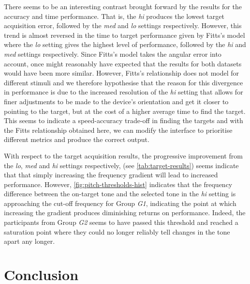 \documentclass[]{interact}
\begin{document}
There seems to be an interesting contrast brought forward by the results for the accuracy and time performance.
That is, the \textit{hi} produces the lowest target acquisition error, followed by the \textit{med} and \textit{lo} settings respectively. 
However, this trend is almost reversed in the time to target performance given by Fitts's model where the \textit{lo} setting gives the highest level of performance, followed by the \textit{hi} and \textit{med} settings respectively. 
Since Fitts's model takes the angular error into account, once might reasonably have expected that the results for both datasets would have been more similar. 
However, Fitts's relationship does not model for different stimuli and we therefore hypothesise that the reason for this divergence in performance is due to the increased resolution of the \textit{hi} setting that allows for finer adjustments to be made to the device's orientation and get it closer to pointing to the target, but at the cost of a higher average time to find the target. 
This seems to indicate a speed-accuracy trade-off in finding the targets and with the Fitts relationship obtained here, we can modify the interface to prioritise different metrics and produce the correct output.

With respect to the target acquisition results, the progressive improvement from the \textit{lo}, \textit{med} and \textit{hi} settings respectively, (see \cref{tab:target-results}) seems indicate that that simply increasing the frequency gradient will lead to increased performance.
However, \cref{fig:pitch-thresholds-hist} indicates that the frequency difference between the on-target tone and the selected tone in the \textit{hi} setting is approaching the cut-off frequency for Group \textit{G1}, indicating the point at which increasing the gradient produces diminishing returns on performance. 
Indeed, the participants from Group \textit{G2} seems to have passed this threshold and reached a saturation point where they could no longer reliably tell changes in the tone apart any longer. 

\section{Conclusion}\label{sec:conclusion}
\end{document}
